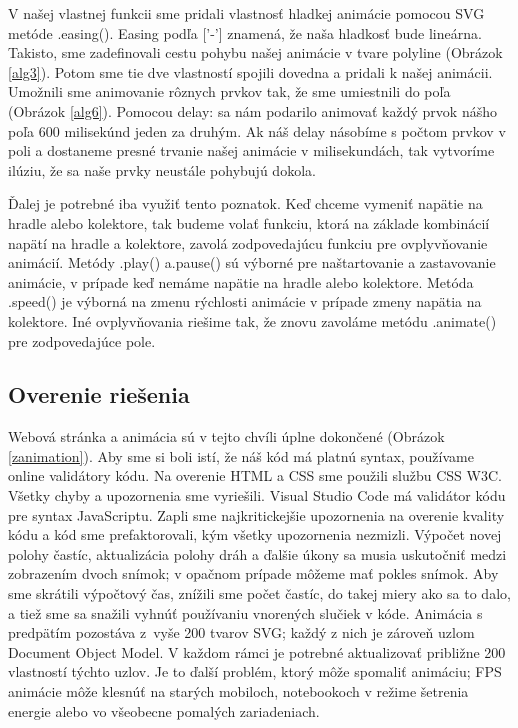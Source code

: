 V našej vlastnej funkcii sme pridali vlastnosť hladkej animácie pomocou \acrshort{SVG} metóde .easing(). Easing podľa [’-’] znamená, že naša hladkosť bude lineárna. Takisto, sme zadefinovali cestu pohybu našej animácie v tvare polyline (Obrázok \ref{alg3}). Potom sme tie dve vlastností spojili dovedna a pridali k našej animácii. Umožnili sme animovanie rôznych prvkov tak, že sme umiestnili do poľa (Obrázok \ref{alg6}). Pomocou delay: sa nám podarilo animovať každý prvok nášho poľa 600 milisekúnd jeden za druhým. Ak náš delay násobíme s počtom prvkov v poli a dostaneme presné trvanie našej animácie v milisekundách, tak vytvoríme ilúziu, že sa naše prvky neustále pohybujú dokola.

Ďalej je potrebné iba využiť tento poznatok. Keď chceme vymeniť napätie na hradle alebo kolektore, tak budeme volať funkciu, ktorá na základe kombinácií napätí na hradle a kolektore, zavolá zodpovedajúcu funkciu pre ovplyvňovanie animácií. Metódy .play() a.pause() sú výborné pre naštartovanie a zastavovanie animácie, v prípade keď nemáme napätie na hradle alebo kolektore. Metóda .speed() je výborná na zmenu rýchlosti animácie v prípade zmeny napätia na kolektore. Iné ovplyvňovania riešime tak, že znovu zavoláme metódu .animate() pre zodpovedajúce pole.

\subsection{Overenie riešenia}
\noindent Webová stránka a animácia sú v tejto chvíli úplne dokončené (Obrázok \ref{zanimation}). Aby sme si  boli istí, že náš kód má platnú syntax, používame online validátory kódu. Na overenie HTML a CSS sme použili službu CSS W3C. Všetky chyby a upozornenia sme vyriešili. Visual Studio Code má validátor kódu pre syntax JavaScriptu. Zapli sme najkritickejšie upozornenia na overenie kvality kódu a kód sme prefaktorovali, kým všetky upozornenia nezmizli. Výpočet  novej polohy častíc, aktualizácia polohy dráh a ďalšie úkony sa musia uskutočniť medzi zobrazením dvoch snímok; v opačnom prípade môžeme mať pokles snímok. Aby sme skrátili výpočtový čas, znížili sme počet častíc, do takej miery ako sa to dalo, a tiež sme sa snažili vyhnúť používaniu vnorených slučiek v kóde. Animácia s predpätím pozostáva z vyše 200 tvarov SVG; každý z nich je zároveň uzlom Document Object Model. V každom rámci je potrebné aktualizovať približne 200 vlastností týchto uzlov. Je to ďalší problém, ktorý môže spomaliť animáciu; FPS animácie môže klesnúť na starých mobiloch, notebookoch v režime šetrenia energie alebo vo všeobecne pomalých zariadeniach.

